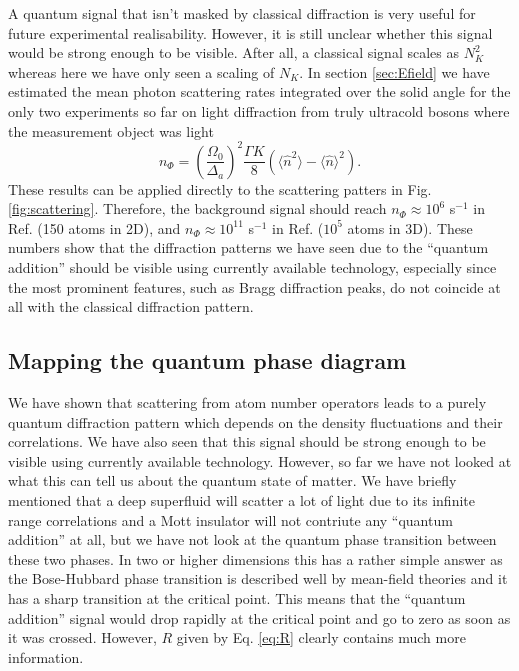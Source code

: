 A quantum signal that isn't masked by classical diffraction is very
useful for future experimental realisability. However, it is still
unclear whether this signal would be strong enough to be
visible. After all, a classical signal scales as $N_K^2$ whereas here
we have only seen a scaling of $N_K$. In section \ref{sec:Efield} we
have estimated the mean photon scattering rates integrated over the
solid angle for the only two experiments so far on light diffraction
from truly ultracold bosons where the measurement object was light
\begin{equation} 
  n_{\Phi}= \left(\frac{\Omega_0}{\Delta_a}\right)^2 \frac{\Gamma K}{8}
  (\langle\hat{n}^2\rangle-\langle\hat{n}\rangle^2).
\end{equation} 
These results can be applied directly to the scattering patters in
Fig. \ref{fig:scattering}. Therefore, the background signal should
reach $n_\Phi \approx 10^6$ s$^{-1}$ in Ref. \cite{weitenberg2011}
(150 atoms in 2D), and $n_\Phi \approx 10^{11}$ s$^{-1}$ in
Ref. \cite{miyake2011} ($10^5$ atoms in 3D). These numbers show that
the diffraction patterns we have seen due to the ``quantum addition''
should be visible using currently available technology, especially
since the most prominent features, such as Bragg diffraction peaks, do
not coincide at all with the classical diffraction pattern.

\subsection{Mapping the quantum phase diagram}

We have shown that scattering from atom number operators leads to a
purely quantum diffraction pattern which depends on the density
fluctuations and their correlations. We have also seen that this
signal should be strong enough to be visible using currently available
technology. However, so far we have not looked at what this can tell
us about the quantum state of matter. We have briefly mentioned that a
deep superfluid will scatter a lot of light due to its infinite range
correlations and a Mott insulator will not contriute any ``quantum
addition'' at all, but we have not look at the quantum phase
transition between these two phases. In two or higher dimensions this
has a rather simple answer as the Bose-Hubbard phase transition is
described well by mean-field theories and it has a sharp transition at
the critical point. This means that the ``quantum addition'' signal
would drop rapidly at the critical point and go to zero as soon as it
was crossed. However, $R$ given by Eq. \eqref{eq:R} clearly contains
much more information.


